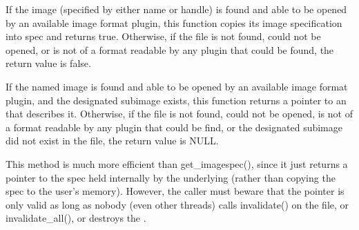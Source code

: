 
If the image (specified by either name or handle)
is found and able to be opened by an available
image format plugin, this function copies its image specification into
{\cf spec} and returns {\cf true}.  Otherwise, if the file is not
found, could not be opened, or is not of a format readable by any
plugin that could be found, the return value is {\cf false}.
\apiend



If the named image is found and able to be opened by an available
image format plugin, and the designated subimage exists, this function
returns a pointer to an \ImageSpec that describes it.  Otherwise, if the
file is not found, could not be opened, is not of a format readable by
any plugin that could be find, or the designated subimage did
not exist in the file, the return value is NULL.

This method is much more efficient than {\cf get_imagespec()}, since it
just returns a pointer to the spec held internally by the underlying \ImageCache
(rather than copying the spec to the user's memory).  However, the
caller must beware that the pointer is only valid as long as nobody
(even other threads) calls {\cf invalidate()} on the file, or {\cf
  invalidate_all()}, or destroys the \TextureSystem.
\apiend


